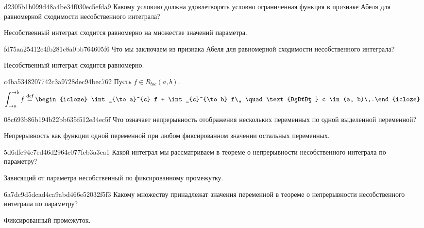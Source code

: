 \begin{note}{d2305b1b099d48a4be34f030ec5efda9}
    Какому условию должна удовлетворять условно ограниченная функция в признаке Абеля для равномерной сходимости несобственного интеграла?

    \begin{cloze}{1}
        Несобственный интеграл сходится равномерно на множестве значений параметра.
    \end{cloze}
\end{note}

\begin{note}{fd75aa25412e4fb281c8a0bb764605f6}
    Что мы заключаем из признака Абеля для равномерной сходимости несобственного интеграла?

    \begin{cloze}{1}
        Несобственный интеграл сходится равномерно.
    \end{cloze}
\end{note}

\begin{note}{c4ba5348207742c3a9728dec94bec762}
    Пусть \({ f \in R_{loc}(a, b) }\).
    \[
        \int_{\to a}^{\to b} f \overset{\text{def}}= \begin{icloze}{1}\int_{\to a}^{c} f + \int_{c}^{\to b} f\,, \quad \text{где } c \in (a, b)\,.\end{icloze}
    \]
\end{note}

\begin{note}{08c693b86b194b22bb635f512e34ec5f}
    Что означает непрерывность отображения нескольких переменных по одной выделенной переменной?

    \begin{cloze}{1}
        Непрерывность как функции одной переменной при любом фиксированном значении остальных переменных.
    \end{cloze}
\end{note}

\begin{note}{5d6dfe94c7ed46d2964c077feb3a3ea1}
    Какой интеграл мы рассматриваем в теореме о непрерывности несобственного интеграла по параметру?

    \begin{cloze}{1}
        Зависящий от параметра несобственный по фиксированному промежутку.
    \end{cloze}
\end{note}

\begin{note}{6a7dc9d5dcad4ca9abd466e52032f5f3}
    Какому множеству принадлежат значения переменной в теореме о непрерывности несобственного интеграла по параметру?

    \begin{cloze}{1}
        Фиксированный промежуток.
    \end{cloze}
\end{note}

